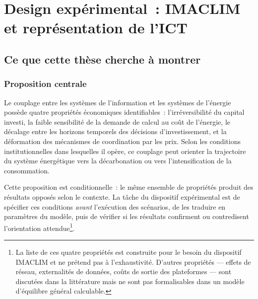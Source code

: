 
\chapter{Design expérimental~: IMACLIM et représentation de l'ICT}\label{ch:imaclim}


\section{Ce que cette thèse cherche à montrer}\label{sec:ch4-hypotheses}


\subsection{Proposition centrale}\label{sec:ch4-these}

Le couplage entre les systèmes de l'information et les systèmes de l'énergie possède quatre propriétés économiques identifiables~: l'irréversibilité du capital investi, la faible sensibilité de la demande de calcul au coût de l'énergie, le décalage entre les horizons temporels des décisions d'investissement, et la déformation des mécanismes de coordination par les prix. Selon les conditions institutionnelles dans lesquelles il opère, ce couplage peut orienter la trajectoire du système énergétique vers la décarbonation ou vers l'intensification de la consommation.

Cette proposition est conditionnelle~: le même ensemble de propriétés produit des résultats opposés selon le contexte. La tâche du dispositif expérimental est de spécifier ces conditions \emph{avant} l'exécution des scénarios, de les traduire en paramètres du modèle, puis de vérifier si les résultats confirment ou contredisent l'orientation attendue\footnote{La liste de ces quatre propriétés est construite pour le besoin du dispositif IMACLIM et ne prétend pas à l'exhaustivité. D'autres propriétés --- effets de réseau, externalités de données, coûts de sortie des plateformes --- sont discutées dans la littérature mais ne sont pas formalisables dans un modèle d'équilibre général calculable.}.


